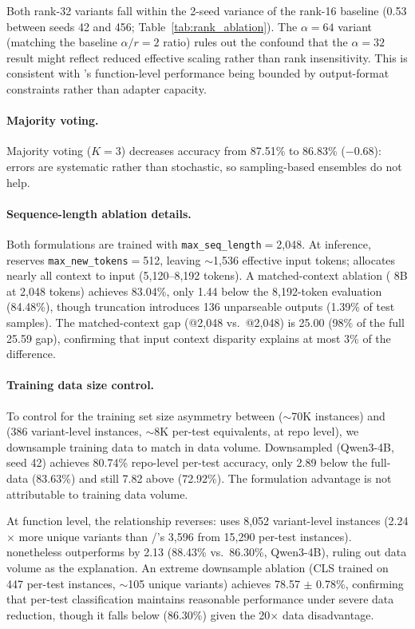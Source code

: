 Both rank-32 variants fall within the 2-seed variance of the rank-16 baseline (0.53\pp{} between seeds 42 and 456; Table~\ref{tab:rank_ablation}). The $\alpha{=}64$ variant (matching the baseline $\alpha/r{=}2$ ratio) rules out the confound that the $\alpha{=}32$ result might reflect reduced effective scaling rather than rank insensitivity. This is consistent with \cwm{}'s function-level performance being bounded by output-format constraints rather than adapter capacity.

\paragraph{Majority voting.}
Majority voting ($K{=}3$) decreases accuracy from 87.51\% to 86.83\% ($-$0.68\pp{}): errors are systematic rather than stochastic, so sampling-based ensembles do not help.

\paragraph{Sequence-length ablation details.}
Both formulations are trained with \texttt{max\_seq\_length}$=$2,048. At inference, \cwm{} reserves \texttt{max\_new\_tokens}$=$512, leaving ${\sim}$1,536 effective input tokens; \cls{} allocates nearly all context to input (5,120--8,192 tokens). A matched-context ablation (\cls{} 8B at 2,048 tokens) achieves 83.04\%, only 1.44\pp{} below the 8,192-token evaluation (84.48\%), though truncation introduces 136 unparseable outputs (1.39\% of test samples). The matched-context gap (\cls{}@2,048 vs.\ \cwm{}@2,048) is 25.00\pp{} (98\% of the full 25.59\pp{} gap), confirming that input context disparity explains at most 3\% of the difference.

\paragraph{Training data size control.}
\label{app:downsample}
To control for the training set size asymmetry between \cls{} (${\sim}$70K instances) and \traj{} (386 variant-level instances, ${\sim}$8K per-test equivalents, at repo level), we downsample \cls{} training data to match \traj{} in data volume. Downsampled \cls{} (Qwen3-4B, seed 42) achieves 80.74\% repo-level per-test accuracy, only 2.89\pp{} below the full-data \cls{} (83.63\%) and still 7.82\pp{} above \traj{} (72.92\%). The \cls{} formulation advantage is not attributable to training data volume.

At function level, the relationship reverses: \traj{} uses 8,052 variant-level instances (2.24$\times$ more unique variants than \cls{}/\cwm{}'s 3,596 from 15,290 per-test instances). \cls{} nonetheless outperforms \traj{} by 2.13\pp{} (88.43\% vs.\ 86.30\%, Qwen3-4B), ruling out data volume as the explanation. An extreme downsample ablation (CLS trained on 447 per-test instances, ${\sim}$105 unique variants) achieves 78.57 $\pm$ 0.78\%, confirming that per-test classification maintains reasonable performance under severe data reduction, though it falls below \traj{} (86.30\%) given the 20$\times$ data disadvantage.

